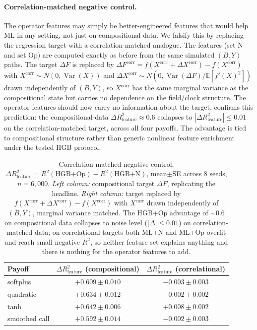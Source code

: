 \documentclass[11pt,reqno]{amsart}
\theoremstyle{plain}
\theoremstyle{definition}
\theoremstyle{remark}
\newcommand{\E}{\mathbb E}
\newcommand{\Bvar}{B}
\newcommand{\Yclock}{Y}
\DeclareMathOperator{\Var}{Var}
\begin{document}
\paragraph{Correlation-matched negative control.}
The operator features may simply be better-engineered features
that would help ML in any setting, not just on compositional
data. We falsify this by replacing the regression target with
a correlation-matched analogue. The features (set N and set
Op) are computed exactly as before from the same simulated
$(\Bvar,\Yclock)$ paths. The target $\Delta F$ is replaced by
$\Delta F^{\mathrm{corr}}=f(X^{\mathrm{corr}}+\Delta X^{\mathrm{corr}})-f(X^{\mathrm{corr}})$
with $X^{\mathrm{corr}}\sim N(0,\Var(X))$ and
$\Delta X^{\mathrm{corr}}\sim N(0,\Var(\Delta F)/\E[f'(X)^{2}])$
drawn independently of $(\Bvar,\Yclock)$, so $X^{\mathrm{corr}}$
has the same marginal variance as the compositional state but
carries no dependence on the field/clock structure. The
operator features should now carry no information about the
target.  confirms this prediction: the
compositional-data $\Delta R^{2}_{\mathrm{feature}}\approx 0.6$
collapses to $|\Delta R^{2}_{\mathrm{feature}}|\le 0.01$ on the
correlation-matched target, across all four payoffs. The
advantage is tied to compositional structure rather than
generic nonlinear feature enrichment under the tested HGB
protocol.

\begin{table}[ht]
\centering
\begin{tabular}{lcc}
\toprule
Payoff & $\Delta R^{2}_{\mathrm{feature}}$ (compositional) &
  $\Delta R^{2}_{\mathrm{feature}}$ (correlational) \\
\midrule
softplus      & $+0.609 \pm 0.010$ & $-0.003 \pm 0.003$ \\
quadratic     & $+0.634 \pm 0.012$ & $-0.002 \pm 0.002$ \\
tanh          & $+0.642 \pm 0.006$ & $+0.008 \pm 0.002$ \\
smoothed call & $+0.592 \pm 0.014$ & $-0.002 \pm 0.003$ \\
\bottomrule
\end{tabular}
\caption{Correlation-matched negative control,
$\Delta R^{2}_{\mathrm{feature}}=R^{2}(\text{HGB+Op})-R^{2}(\text{HGB+N})$,
mean$\pm$SE across 8 seeds, $n=6{,}000$. \emph{Left column:}
compositional target $\Delta F$, replicating the headline.
\emph{Right column:} target replaced by
$f(X^{\mathrm{corr}}+\Delta X^{\mathrm{corr}})-f(X^{\mathrm{corr}})$
with $X^{\mathrm{corr}}$ drawn independently of
$(\Bvar,\Yclock)$, marginal variance matched. The HGB+Op
advantage of $\sim 0.6$ on compositional data collapses to
noise level ($|\Delta|\le 0.01$) on correlation-matched data;
on correlational targets both ML+N and ML+Op overfit and reach
small negative $R^{2}$, so neither feature set explains
anything and there is nothing for the operator features to
add.}
\label{tab:negctrl}
\end{table}
\end{document}
